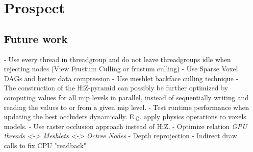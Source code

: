 \chapter{Prospect} \label{cpt-prospect}



\section{Future work}

- Use every thread in threadgroup and do not leave threadgroups idle when rejecting nodes (View Frustum Culling or frustum culling)
- Use Sparse Voxel DAGs and better data compression
- Use meshlet backface culling technique
- The construction of the \ac{HiZ}-pyramid can possibly be further optimized by computing values for all mip levels 
  in parallel, instead of sequentially writing and reading the values to or from a given mip level. 
- Test runtime performance when updating the best occluders dynamically. E.g. apply physics operations to voxels models.
- Use raster occlusion approach \cite{NVIDIAGLOC2016} instead of \ac{HiZ}.
- Optimize relation \emph{GPU threads <-> Meshlets <-> Octree Nodes}
- Depth reprojection
- Indirect draw calls to fix CPU "readback"
